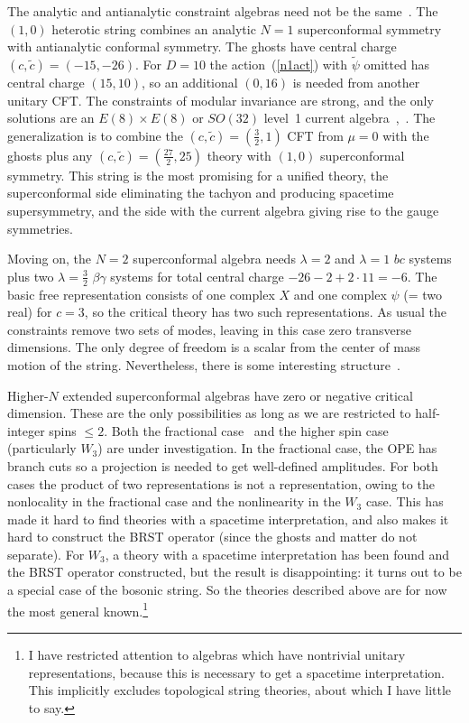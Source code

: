 The analytic and antianalytic constraint algebras need not be the
same~\cite{GHMR}.  The $(1,0)$ heterotic string combines an analytic
$N=1$ superconformal symmetry with antianalytic conformal symmetry. 
The ghosts have central charge $(c,\tilde c) = (-15,-26)$.  For
$D=10$ the action~(\ref{n1act}) with $\tilde\psi$ omitted has central
charge $(15,10)$, so an additional $(0,16)$ is needed from another
unitary CFT.  The constraints of modular invariance are strong, and
the only solutions are an $E(8)\times E(8)$ or $SO(32)$ level~1
current algebra~\cite{GHMR},~\cite{GSan}.  The generalization is to
combine the
$(c,\tilde c) = (\frac{3}{2},1)$ CFT from $\mu = 0$ with the ghosts plus
any $(c,\tilde c) = (\frac{27}{2},25)$ theory with $(1,0)$
superconformal symmetry.  This string is the most promising for a
unified theory, the superconformal side eliminating the tachyon and
producing spacetime supersymmetry, and the side with the current
algebra giving rise to the gauge symmetries.

Moving on, the $N=2$ superconformal algebra needs $\lambda =
2$ and $\lambda = 1$ $bc$ systems plus two $\lambda = \frac{3}{2}$
$\beta\gamma$ systems for total central charge $-26-2 + 2 \cdot 11 =
-6$.  The basic free representation consists of one complex $X$ and
one complex $\psi$ (= two real) for $c=3$, so the critical theory
has two such representations.  As usual the constraints remove two
sets of modes, leaving in this case zero transverse dimensions. 
The only degree of freedom is a scalar from the center of mass
motion of the string.  Nevertheless, there is some interesting
structure~\cite{OV}.

Higher-$N$ extended superconformal algebras have zero or negative
critical dimension.  These are the only possibilities as long as we
are restricted to half-integer spins $\leq 2$.  Both the fractional
case~\cite{Tye93} and the higher spin case~\cite{Pw93} (particularly
$W_3$) are under investigation.  In the fractional case, the OPE has
branch cuts so a projection is needed to get well-defined
amplitudes.  For both cases the product of two representations is not
a representation, owing to the nonlocality in the fractional case and
the nonlinearity in the $W_3$ case.  This has made it hard to find
theories with a spacetime interpretation, and also makes it hard to
construct the BRST operator (since the ghosts and matter do not
separate).  For $W_3$, a theory with a spacetime interpretation has
been found and the BRST operator constructed, but the result is
disappointing: it turns out to be a special case of the bosonic
string.
So the theories described above are for now the most general
known.\footnote
{I have restricted attention to algebras which have nontrivial unitary
representations, because this is necessary to get a spacetime
interpretation.  This implicitly excludes topological string
theories, about which I have little to say.}


